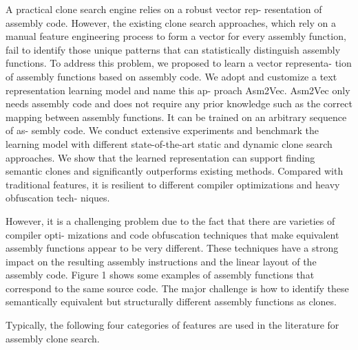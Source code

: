 A practical clone search engine relies on a robust vector rep-
resentation of assembly code. However, the existing clone search
approaches, which rely on a manual feature engineering process
to form a vector for every assembly function, fail to identify those
unique patterns that can statistically distinguish assembly functions.
To address this problem, we proposed to learn a vector representa-
tion of assembly functions based on assembly code. We adopt and
customize a text representation learning model and name this ap-
proach Asm2Vec. Asm2Vec only needs assembly code and does not
require any prior knowledge such as the correct mapping between
assembly functions. It can be trained on an arbitrary sequence of as-
sembly code. We conduct extensive experiments and benchmark the
learning model with different state-of-the-art static and dynamic
clone search approaches. We show that the learned representation
can support finding semantic clones and significantly outperforms
existing methods. Compared with traditional features, it is resilient
to different compiler optimizations and heavy obfuscation tech-
niques.

However, it is a challenging
problem due to the fact that there are varieties of compiler opti-
mizations and code obfuscation techniques that make equivalent
assembly functions appear to be very different. These techniques
have a strong impact on the resulting assembly instructions and the
linear layout of the assembly code. Figure 1 shows some examples
of assembly functions that correspond to the same source code. The
major challenge is how to identify these semantically equivalent
but structurally different assembly functions as clones.

Typically, the following four categories of features are used in the literature
for assembly clone search.

